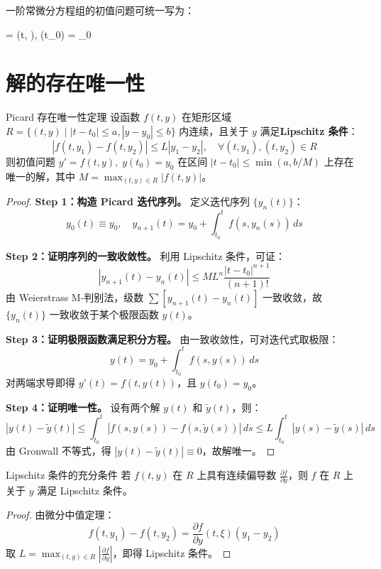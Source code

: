 一阶常微分方程组的初值问题可统一写为：
\begin{myformula}
	 = (t, ), \quad {}(t_0) = _0
\end{myformula}

\section{解的存在唯一性}

\begin{theorem}{Picard 存在唯一性定理}
	设函数 $f(t, y)$ 在矩形区域 $R = \{(t, y) \mid |t - t_0| \le a, |y - y_0| \le b\}$ 内连续，且关于 $y$ 满足\textbf{Lipschitz 条件}：
	\[
	|f(t, y_1) - f(t, y_2)| \le L |y_1 - y_2|, \quad \forall (t, y_1), (t, y_2) \in R
	\]
	则初值问题 $y' = f(t, y), \; y(t_0) = y_0$ 在区间 $|t - t_0| \le \min(a, b/M)$ 上存在唯一的解，其中 $M = \max_{(t,y)\in R} |f(t, y)|$。
\end{theorem}

\begin{proof}
	\textbf{Step 1：构造 Picard 迭代序列。}
	定义迭代序列 $\{y_n(t)\}$：
	\[
	y_0(t) \equiv y_0, \quad y_{n+1}(t) = y_0 + \int_{t_0}^{t} f(s, y_n(s)) \, ds
	\]
	
	\textbf{Step 2：证明序列的一致收敛性。}
	利用 Lipschitz 条件，可证：
	\[
	|y_{n+1}(t) - y_n(t)| \le M L^n \frac{|t - t_0|^{n+1}}{(n+1)!}
	\]
	由 Weierstrass M-判别法，级数 $\sum [y_{n+1}(t) - y_n(t)]$ 一致收敛，故 $\{y_n(t)\}$ 一致收敛于某个极限函数 $y(t)$。
	
	\textbf{Step 3：证明极限函数满足积分方程。}
	由一致收敛性，可对迭代式取极限：
	\[
	y(t) = y_0 + \int_{t_0}^{t} f(s, y(s)) \, ds
	\]
	对两端求导即得 $y'(t) = f(t, y(t))$，且 $y(t_0) = y_0$。
	
	\textbf{Step 4：证明唯一性。}
	设有两个解 $y(t)$ 和 $\tilde{y}(t)$，则：
	\[
	|y(t) - \tilde{y}(t)| \le \int_{t_0}^{t} |f(s, y(s)) - f(s, \tilde{y}(s))| \, ds \le L \int_{t_0}^{t} |y(s) - \tilde{y}(s)| \, ds
	\]
	由 Gronwall 不等式，得 $|y(t) - \tilde{y}(t)| \equiv 0$，故解唯一。
\end{proof}

\begin{corollary}{Lipschitz 条件的充分条件}
	若 $f(t, y)$ 在 $R$ 上具有连续偏导数 $\frac{\partial f}{\partial y}$，则 $f$ 在 $R$ 上关于 $y$ 满足 Lipschitz 条件。
\end{corollary}

\begin{proof}
	由微分中值定理：
	\[
	f(t, y_1) - f(t, y_2) = \frac{\partial f}{\partial y}(t, \xi) (y_1 - y_2)
	\]
	取 $L = \max_{(t,y)\in R} \left|\frac{\partial f}{\partial y}\right|$，即得 Lipschitz 条件。
\end{proof}

